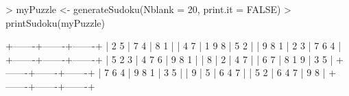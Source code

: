 \begin{Schunk}
\begin{Sinput}
> myPuzzle <- generateSudoku(Nblank = 20, print.it = FALSE)
> printSudoku(myPuzzle)
\end{Sinput}
\begin{Soutput}
  +-------+-------+-------+
  | 2   5 | 7   4 | 8 1   |
  | 4 7   | 1 9 8 | 5 2   |
  | 9 8 1 |   2 3 | 7 6 4 |
  +-------+-------+-------+
  | 5 2 3 | 4 7 6 | 9 8 1 |
  |     8 |     2 | 4 7   |
  | 6   7 | 8 1 9 | 3 5   |
  +-------+-------+-------+
  | 7 6 4 | 9 8 1 |   3 5 |
  |     9 |     5 | 6 4 7 |
  |   5 2 | 6 4 7 |   9 8 |
  +-------+-------+-------+
\end{Soutput}
\end{Schunk}
